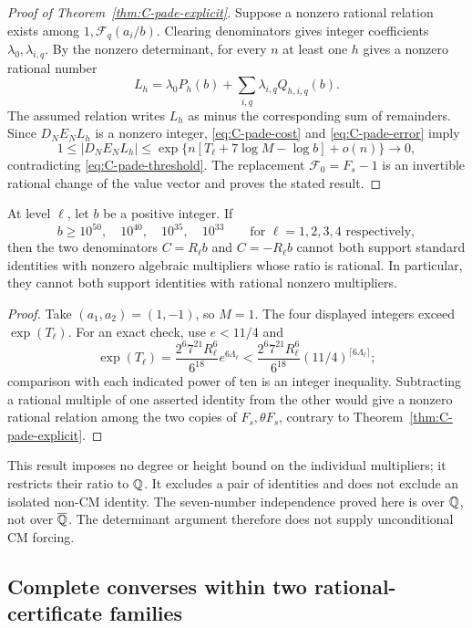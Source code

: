\begin{proof}[Proof of Theorem~\ref{thm:C-pade-explicit}]
Suppose a nonzero rational relation exists among
$1,\mathcal F_q(a_i/b)$.  Clearing denominators gives integer
coefficients $\lambda_0,\lambda_{i,q}$.  By the nonzero determinant,
for every $n$ at least one $h$ gives a nonzero rational number
\[
 L_h=\lambda_0P_h(b)+\sum_{i,q}\lambda_{i,q}Q_{h,i,q}(b).
\]
The assumed relation writes $L_h$ as minus the corresponding sum
of remainders.  Since $D_NE_NL_h$ is a nonzero integer,
\eqref{eq:C-pade-cost} and \eqref{eq:C-pade-error} imply
\[
 1\le|D_NE_NL_h|
 \le\exp\{n[T_\ell+7\log M-\log b]+o(n)\}\longrightarrow0,
\]
contradicting \eqref{eq:C-pade-threshold}.  The replacement
$\mathcal F_0=F_s-1$ is an invertible rational change of the value
vector and proves the stated result.
\end{proof}

\begin{corollary}
\label{cor:C-pade-opposite}
At level $\ell$, let $b$ be a positive integer.  If
\[
 b\ge10^{50},\quad10^{40},\quad10^{35},\quad10^{33}
 \qquad\text{for }\ell=1,2,3,4\text{ respectively},
\]
then the two denominators $C=R_\ell b$ and $C=-R_\ell b$ cannot
both support standard identities with nonzero algebraic multipliers
whose ratio is rational.  In particular, they cannot both support
identities with rational nonzero multipliers.
\end{corollary}

\begin{proof}
Take $(a_1,a_2)=(1,-1)$, so $M=1$.  The four displayed integers
exceed $\exp(T_\ell)$.  For an exact check, use $e<11/4$ and
\[
 \exp(T_\ell)
 =\frac{2^6 7^{21}R_\ell^6}{6^{18}}e^{6\Lambda_\ell}
 <\frac{2^6 7^{21}R_\ell^6}{6^{18}}
       (11/4)^{\lceil6\Lambda_\ell\rceil};
\]
comparison with each indicated power of ten is an integer inequality.
Subtracting a rational multiple of one asserted identity from the
other would give a nonzero rational relation among the two copies
of $F_s,\theta F_s$, contrary to
Theorem~\ref{thm:C-pade-explicit}.
\end{proof}

This result imposes no degree or height bound on the individual
multipliers; it restricts their ratio to $\mathbb Q$.  It excludes a pair
of identities and does not exclude an isolated non-CM identity.
The seven-number independence proved here is over $\mathbb Q$, not over
$\overline{\mathbb Q}$.  The determinant argument therefore does not supply
unconditional CM forcing.

\subsection{Complete converses within two rational-certificate families}
\label{sec:C-wz-converses}

